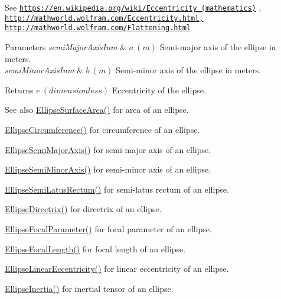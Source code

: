 See \href{https://en.wikipedia.org/wiki/Eccentricity_(mathematics)}{\tt https\+://en.\+wikipedia.\+org/wiki/\+Eccentricity\+\_\+(mathematics)} , \href{http://mathworld.wolfram.com/Eccentricity.html,}{\tt http\+://mathworld.\+wolfram.\+com/\+Eccentricity.\+html,} \href{http://mathworld.wolfram.com/Flattening.html}{\tt http\+://mathworld.\+wolfram.\+com/\+Flattening.\+html} 
\begin{DoxyParams}{Parameters}
{\em semi\+Major\+Axis\+Inm} & $ a\ (m)$ Semi-\/major axis of the ellipse in meters. \\
\hline
{\em semi\+Minor\+Axis\+Inm} & $ b\ (m)$ Semi-\/minor axis of the ellipse in meters. \\
\hline
\end{DoxyParams}
\begin{DoxyReturn}{Returns}
$ e\ (dimensionless)$ Eccentricity of the ellipse. 
\end{DoxyReturn}
\begin{DoxySeeAlso}{See also}
\mbox{\hyperlink{group___e_g_x_math-_geometry-2_d-_ellipse-_surface_area_ga4ce8c8323e9718ce5458f4ab7f6d823d}{Ellipse\+Surface\+Area()}} for area of an ellipse. 

\mbox{\hyperlink{group___e_g_x_math-_geometry-2_d-_ellipse-_circumference_ga4172802ac674eb53467b44928ac635c7}{Ellipse\+Circumference()}} for circumference of an ellipse. 

\mbox{\hyperlink{group___e_g_x_math-_geometry-2_d-_ellipse-_semi_major_axis_ga646a2ca065f4ac3f666a9ea22f3bb527}{Ellipse\+Semi\+Major\+Axis()}} for semi-\/major axis of an ellipse. 

\mbox{\hyperlink{group___e_g_x_math-_geometry-2_d-_ellipse-_semi_minor_axis_gae461acf3333565d69527dd86e9aa2b32}{Ellipse\+Semi\+Minor\+Axis()}} for semi-\/minor axis of an ellipse. 

\mbox{\hyperlink{group___e_g_x_math-_geometry-2_d-_ellipse-_semi_latus_rectum_gacfd1844eb4ef3d1ee3c0b460a6442ae6}{Ellipse\+Semi\+Latus\+Rectum()}} for semi-\/latus rectum of an ellipse. 

\mbox{\hyperlink{group___e_g_x_math-_geometry-2_d-_ellipse-_directrix_gace8f72a8efbc9c18d3eb689151405106}{Ellipse\+Directrix()}} for directrix of an ellipse. 

\mbox{\hyperlink{group___e_g_x_math-_geometry-2_d-_ellipse-_focal_parameter_ga4cd01a38c72c092ef9791351948bf69b}{Ellipse\+Focal\+Parameter()}} for focal parameter of an ellipse. 

\mbox{\hyperlink{group___e_g_x_math-_geometry-2_d-_ellipse-_focal_length_gab8d63de7640c880cfecaeada6f2afdac}{Ellipse\+Focal\+Length()}} for focal length of an ellipse. 

\mbox{\hyperlink{group___e_g_x_math-_geometry-2_d-_ellipse-_linear_eccentricity_gac70b3010e30aa8b73deb50fe2b9b9a91}{Ellipse\+Linear\+Eccentricity()}} for linear eccentricity of an ellipse. 

\mbox{\hyperlink{group___e_g_x_math-_geometry-2_d-_ellipse-_inertia_ga10a3049c2f04b50f271fb01dc62e4cf8}{Ellipse\+Inertia()}} for inertial tensor of an ellipse. 
\end{DoxySeeAlso}
